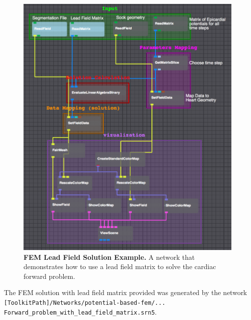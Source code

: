 \begin{figure}[H]
\begin{center}
\includegraphics[width=\textwidth]{ECGToolkitGuide_figures/FEM_LeadNet.png}
\caption{{\bf FEM Lead Field Solution Example.} A network that demonstrates how to use a lead field matrix to solve the cardiac forward problem.}
\label{fig:FEM_LeadNet}
\end{center}
\end{figure}
\noindent 
The FEM solution with lead field matrix provided was generated by the network \newline
{\tt [ToolkitPath]/Networks/potential-based-fem/... \\Forward\_problem\_with\_lead\_field\_matrix.srn5}.

